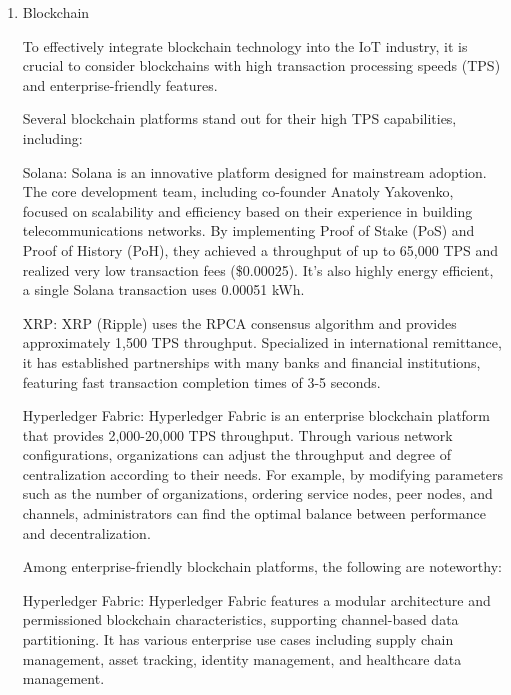 \documentclass[conference]{IEEEtran}
\begin{document}
\begin{enumerate}[itemsep=2ex, parsep=1ex]
	\item Blockchain
	      	      	      
	      To effectively integrate blockchain technology into the IoT industry, it is
	      crucial to consider blockchains with high transaction processing speeds (TPS)
	      and enterprise-friendly features.
	      	      	      
	      Several blockchain platforms stand out for their high TPS capabilities,
	      including:
	      	      	      
	      Solana: Solana is an innovative platform designed for mainstream adoption.
	      The core development team, including co-founder Anatoly Yakovenko, focused
	      on scalability and efficiency based on their experience in building
	      telecommunications networks. By implementing Proof of Stake (PoS) and Proof
	      of History (PoH), they achieved a throughput of up to 65,000 TPS and
	      realized very low transaction fees (\$0.00025). It's also highly energy
	      efficient, a single Solana transaction uses 0.00051 kWh.
	      	      	      
	      XRP: XRP (Ripple) uses the RPCA consensus algorithm and provides
	      approximately 1,500 TPS throughput. Specialized in international remittance,
	      it has established partnerships with many banks and financial institutions,
	      featuring fast transaction completion times of 3-5 seconds.
	      	      	      
	      Hyperledger Fabric: Hyperledger Fabric is an enterprise blockchain
	      platform that provides 2,000-20,000 TPS throughput. Through various network
	      configurations, organizations can adjust the throughput and degree of
	      centralization according to their needs. For example, by modifying
	      parameters such as the number of organizations, ordering service nodes,
	      peer nodes, and channels, administrators can find the optimal balance
	      between performance and decentralization.
	      	      	      
	      Among enterprise-friendly blockchain platforms, the following are noteworthy:
	      	      	      
	      Hyperledger Fabric: Hyperledger Fabric features a modular architecture and
	      permissioned blockchain characteristics, supporting channel-based data partitioning.
	      It has various enterprise use cases including supply chain management, asset
	      tracking, identity management, and healthcare data management.
	      	      	      

\end{enumerate}
\end{document}
